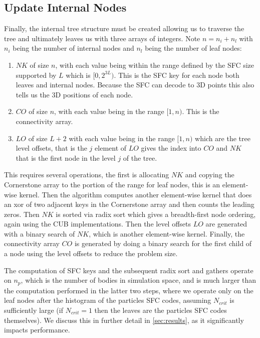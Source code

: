 \subsection{Update Internal Nodes}
Finally, the internal tree structure must be created allowing us to traverse the tree and ultimately leaves us with three arrays of integers. Note $n = n_i + n_l$ with $n_i$ being the number of internal nodes and $n_l$ being the number of leaf nodes:
\begin{enumerate}
    \item $NK$ of size $n$, with each value being within the range defined by the SFC size supported by $L$ which is $[0,2^{3L})$. This is the SFC key for each node both leaves and internal nodes. Because the SFC can decode to 3D points this also tells us the 3D positions of each node.
    \item $CO$ of size $n$, with each value being in the range $[1,n)$. This is the connectivity array.
    \item $LO$ of size $L + 2$ with each value being in the range $[1,n)$ which are the tree level offsets, that is the $j$ element of $LO$ gives the index into $CO$ and $NK$ that is the first node in the level $j$ of the tree.
\end{enumerate}

This requires several operations, the first is allocating $NK$ and copying the Cornerstone array to the portion of the range for leaf nodes, this is an element-wise kernel. Then the algorithm computes another element-wise kernel that does an xor of two adjacent keys in the Cornerstone array and then counts the leading zeros. Then $NK$ is sorted via radix sort which gives a breadth-first node ordering, again using the CUB implementations. Then the level offsets $LO$ are generated with a binary search of $NK$, which is another element-wise kernel. Finally, the connectivity array $CO$ is generated by doing a binary search for the first child of a node using the level offsets to reduce the problem size.

The computation of SFC keys and the subsequent radix sort and gathers operate on $n_p$, which is the number of bodies in simulation space, and is much larger than the computation performed in the latter two steps, where we operate only on the leaf nodes after the histogram of the particles SFC codes, assuming $N_{crit}$ is sufficiently large (if $N_{crit} = 1$ then the leaves are the particles SFC codes themselves). We discuss this in further detail in \ref{sec:results}, as it significantly impacts performance.

